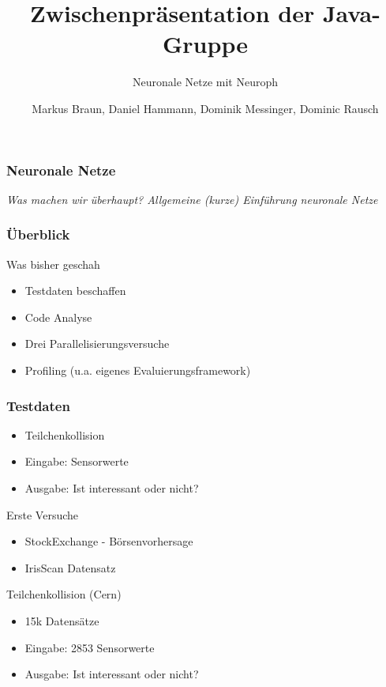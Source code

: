 \documentclass[18pt]{beamer}
\title{Zwischenpräsentation der Java-Gruppe}
\subtitle{Neuronale Netze mit Neuroph}
\author{Markus Braun, Daniel Hammann, Dominik Messinger, Dominic Rausch}
\institute{Institut für Programmstrukturen und Datenorganisation (IPD), Lehrstuhl für Programmiersysteme}
\begin{document}
	\maketitle

	\begin{frame}[c]\frametitle{Neuronale Netze}
		\begin{center}
		\textit{Was machen wir überhaupt? Allgemeine (kurze) Einführung neuronale Netze}
		\end{center}
	\end{frame}

	\begin{frame}[c]\frametitle{Überblick}
		\begin{block}{Was bisher geschah}
		    \begin{itemize}
			    \item Testdaten beschaffen
		    	\item Code Analyse
		    	\item Drei Parallelisierungsversuche
		    	\item Profiling (u.a. eigenes Evaluierungsframework)
		    \end{itemize}		    
		\end{block}
	\end{frame}
	
	\begin{frame}[c]\frametitle{Testdaten}
		\begin{itemize}
				\item Teilchenkollision
				\item Eingabe: Sensorwerte
				\item Ausgabe: Ist interessant oder nicht?
		\end{itemize}
				\begin{block}{Erste Versuche}
		    \begin{itemize}
		    	\item StockExchange - Börsenvorhersage
		    	\item IrisScan Datensatz
		    \end{itemize}
		\end{block}
		\begin{block}{Teilchenkollision (Cern)}
		    \begin{itemize}
		    	\item 15k Datensätze
		    	\item Eingabe: 2853 Sensorwerte
				\item Ausgabe: Ist interessant oder nicht? %
		    \end{itemize}
		\end{block}		
	\end{frame}
\end{document}
